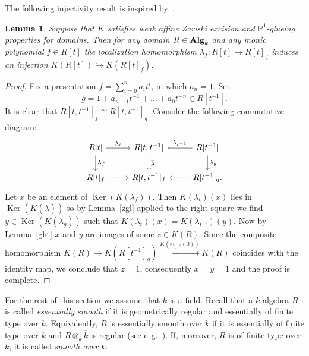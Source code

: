 \documentclass[oneside, 11pt]{amsart}
\numberwithin{equation}{section}
\newtheorem{lemma}{Lemma} \numberwithin{lemma}{section}
\newcommand{\Ker}{\mathop{\mathrm{Ker}}\nolimits}
\theoremstyle{definition}
\theoremstyle{definition}
\theoremstyle{remark}
\newcommand{\catname}[1]{{\normalfont\textbf{#1}}} %
\begin{document}
The following injectivity result is inspired by~\cite[Corollary~5.2]{Tu83}.
\begin{lemma} \label{lmp}
Suppose that $K$ satisfies weak affine Zariski excision and $\mathbb{P}^1$-glueing properties for domains. Then for any domain $R\in \catname{Alg}_k$ and any monic polynomial $f\in R[t]$ the localization homomorphism $\lambda_f\colon R[t]\rightarrow R[t]_f$ induces an injection $K(R[t])\hookrightarrow K(R[t]_f).$ \end{lemma}
\begin{proof}
	Fix a presentation $f=\sum_{i=0}^n a_it^i$, in which $a_n=1$. Set $$g=1+a_{n-1}t^{-1}+\ldots+a_0t^{-n}\in R[t^{-1}].$$ It is clear that $R[t, t^{-1}]_f \cong R[t, t^{-1}]_g$. Consider the following commutative diagram:
$$\begin{tikzcd}
	R[t] \ar{r}{\lambda_t} \ar{d}{\lambda_f} & R[t, t^{-1}] \ar{d}{\overline{\lambda}} & R[t^{-1}] \ar{l}[']{\lambda_{t^{-1}}} \ar{d}{\lambda_g}\\
	R[t]_f \ar{r} & R[t, t^{-1}]_f & R[t^{-1}]_g. \ar{l}
\end{tikzcd}$$
Let $x$ be an element of $\Ker(K(\lambda_f))$. Then $K(\lambda_t)(x)$ lies in $\Ker(K(\overline{\lambda}))$ so by Lemma~\ref{zgl} applied to the right square we find $y \in \Ker(K(\lambda_{g}))$ such that $K(\lambda_t)(x) = K(\lambda_{t^{-1}})(y)$. Now by Lemma~\ref{ght} $x$ and $y$ are images of some $z \in K(R)$. 
Since the composite homomorphism $K(R) \to K(R[t^{-1}]_g) \xrightarrow{K(ev_{t^{-1}}(0))} K(R)$ coincides with the identity map, we conclude that $z=1$, consequently $x = y = 1$ and the proof is complete. \end{proof}

For the rest of this section we assume that $k$ is a field.
Recall that a $k$-algebra $R$ is called {\it essentially smooth} if it is geometrically regular and essentially of finite type over $k$. 
Equivalently, $R$ is essentially smooth over $k$ if it is essentially of finite type over $k$ and $R\otimes_k\overline k$ is regular (see e.\,g.~\cite[p.~137]{Sw98}). 
If, moreover, $R$ is of finite type over $k$, it is called {\it smooth over $k$}.
\end{document}
